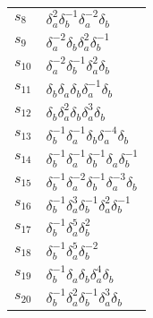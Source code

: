 \documentclass{article}
\begin{document}
\begin{center}
\begin{tabular}{ll}
$s_{8}$ & $\delta_a^{2}\delta_b^{-1}\delta_a^{-2}\delta_b^{}$ \\
$s_{9}$ & $\delta_a^{-2}\delta_b^{}\delta_a^{2}\delta_b^{-1}$ \\
$s_{10}$ & $\delta_a^{-2}\delta_b^{-1}\delta_a^{2}\delta_b^{}$ \\
$s_{11}$ & $\delta_b^{}\delta_a^{}\delta_b^{}\delta_a^{-1}\delta_b^{}$ \\
$s_{12}$ & $\delta_b^{}\delta_a^{2}\delta_b^{}\delta_a^{3}\delta_b^{}$ \\
$s_{13}$ & $\delta_b^{-1}\delta_a^{-1}\delta_b^{}\delta_a^{-4}\delta_b^{}$ \\
$s_{14}$ & $\delta_b^{-1}\delta_a^{-1}\delta_b^{-1}\delta_a^{}\delta_b^{-1}$ \\
$s_{15}$ & $\delta_b^{-1}\delta_a^{-2}\delta_b^{-1}\delta_a^{-3}\delta_b^{}$ \\
$s_{16}$ & $\delta_b^{-1}\delta_a^{3}\delta_b^{-1}\delta_a^{2}\delta_b^{-1}$ \\
$s_{17}$ & $\delta_b^{-1}\delta_a^{5}\delta_b^{2}$ \\
$s_{18}$ & $\delta_b^{-1}\delta_a^{5}\delta_b^{-2}$ \\
$s_{19}$ & $\delta_b^{-1}\delta_a^{}\delta_b^{}\delta_a^{4}\delta_b^{}$ \\
$s_{20}$ & $\delta_b^{-1}\delta_a^{2}\delta_b^{-1}\delta_a^{3}\delta_b^{}$ \\
\bottomrule
\end{tabular}
\end{center}

\thispagestyle{empty}
\end{document}
